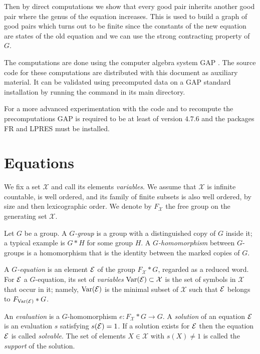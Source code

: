 \documentclass[a4paper,11pt]{amsart}
\begin{document}
Then by direct computations we show that every good pair inherits
another good pair where the genus of the equation increases.
This is used to build a graph of good pairs which turns out 
to be finite since the constants of the new equation are states
of the old equation and we can use the strong contracting property
of $G$. 

The computations are done
 using the computer algebra system GAP \cite{GAP4}. The source
code for these computations are distributed with this document as
auxiliary material. It can be validated using precomputed data on a
GAP standard installation by running the command  in its main directory.

For a more advanced experimentation with the code and to recompute 
the precomputations GAP is required to be at least of version $4.7.6$
and the packages FR\cite{FR2.3.6} and 
LPRES\cite{LPRES0.3.0} must be installed.

\section{Equations}
We fix a set $\mathcal{X}$ and call its elements \emph{variables}.  We assume
that $\mathcal{X}$ is infinite countable, is well ordered, and its family of finite
subsets is also well ordered, by size and then lexicographic order. We
denote by $F_{\mathcal{X}}$ the free group on the generating set $\mathcal{X}$.

\begin{defi}
  Let $G$ be a group. A \emph{$G$-group} is a group with a
  distinguished copy of $G$ inside it; a typical example is 
  $G*H$ for some group $H$. A \emph{$G$-homomorphism} 
  between $G$-groups is a homomorphism
  that is the identity between the marked copies of $G$.

  A \emph{$G$-equation} is an element $\mathcal{E}$ of the group $F_{\mathcal{X}} * G$,
  regarded as a reduced word. For $\mathcal{E}$ a $G$-equation, its set of
  \emph{variables} $\textup{Var}(\mathcal{E})\subset \mathcal{X}$ is the set of symbols in $\mathcal{X}$
  that occur in it; namely, $\textup{Var}(\mathcal{E})$ is the minimal subset of $\mathcal{X}$
  such that $\mathcal{E}$ belongs to $F_{\textup{Var}(\mathcal{E})}*G$. 

  An \emph{evaluation} is a $G$-homomorphism $e\colon F_{\mathcal{X}} * G \to G$.
  A \emph{solution} of an equation $\mathcal{E}$ is an evaluation $s$
  satisfying $s(\mathcal{E})=1$. If a solution exists for $\mathcal{E}$ then the
  equation $\mathcal{E}$ is called \emph{solvable}. The set of elements
  $X\in \mathcal{X}$ with $s(X)\neq 1$ is called the \emph{support} of the solution.
\end{defi}
\end{document}
